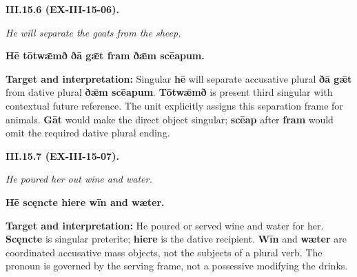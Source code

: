 \par\begin{minipage}{\linewidth}\raggedright
\textbf{III.15.6 (EX-III-15-06).}

\emph{He will separate the goats from the sheep.}

\textbf{Hē tōtwǣmð ðā gǣt fram ðǣm scēapum.}

\textbf{Target and interpretation:} Singular \textbf{hē} will separate accusative plural \textbf{ðā gǣt} from dative plural \textbf{ðǣm scēapum}. \textbf{Tōtwǣmð} is present third singular with contextual future reference. The unit explicitly assigns this separation frame for animals. \textbf{Gāt} would make the direct object singular; \textbf{scēap} after \textbf{fram} would omit the required dative plural ending.

\end{minipage}\par\addvspace{4pt}

\par\begin{minipage}{\linewidth}\raggedright
\textbf{III.15.7 (EX-III-15-07).}

\emph{He poured her out wine and water.}

\textbf{Hē scęncte hiere wīn and wæter.}

\textbf{Target and interpretation:} He poured or served wine and water for her. \textbf{Scęncte} is singular preterite; \textbf{hiere} is the dative recipient. \textbf{Wīn} and \textbf{wæter} are coordinated accusative mass objects, not the subjects of a plural verb. The pronoun is governed by the serving frame, not a possessive modifying the drinks.

\end{minipage}\par\addvspace{4pt}

